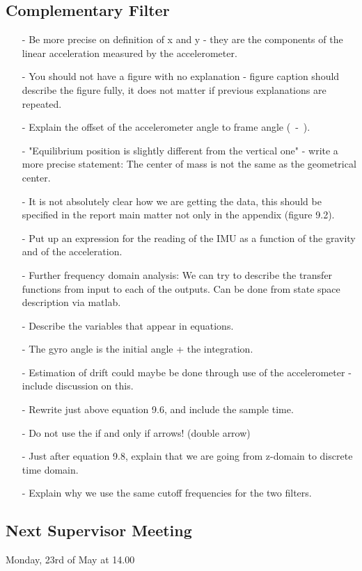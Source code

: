 \subsection{Complementary Filter}
\begin{itemize}
  \item[-] Be more precise on definition of x and y - they are the components of the linear acceleration measured by the accelerometer.
  \item[-] You should not have a figure with no explanation - figure caption should describe the figure fully, it does not matter if previous explanations are repeated.
  \item[-] Explain the offset of the accelerometer angle to frame angle (\si{\theta-}).
  \item[-] "Equilibrium position is slightly different from the vertical one" - write a more precise statement: The center of mass is not the same as the geometrical center.
  \item[-] It is not absolutely clear how we are getting the data, this should be specified in the report main matter not only in the appendix (figure 9.2).
  \item[-] Put up an expression for the reading of the IMU as a function of the gravity and of the acceleration.
  \item[-] Further frequency domain analysis: We can try to describe the transfer functions from input to each of the outputs. Can be done from state space description via matlab.
  \item[-] Describe the variables that appear in equations.
  \item[-] The gyro angle is the initial angle + the integration.
  \item[-] Estimation of drift could maybe be done through use of the accelerometer - include discussion on this.
  \item[-] Rewrite just above equation 9.6, and include the sample time.
  \item[-] Do not use the if and only if arrows! (double arrow)
  \item[-] Just after equation 9.8, explain that we are going from z-domain to discrete time domain.
  \item[-] Explain why we use the same cutoff frequencies for the two filters.
\end{itemize}

\subsection{Next Supervisor Meeting}
Monday, 23rd of May at 14.00

